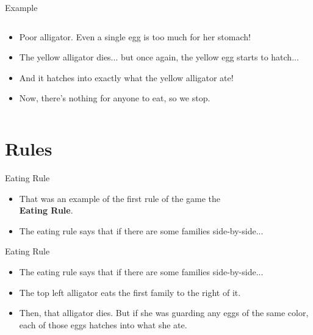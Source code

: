 \documentclass[usenames,dvipsnames]{beamer}
\newcommand{\pic}[2]{\texttt{[image: \#2]}}
\begin{document}
\begin{frame}{Example}
\begin{columns}
\begin{column}{0.6\textwidth}
\begin{itemize}
      \item<8|only@8>
        Poor alligator. Even a single egg is too much for her stomach!

      \item<9|only@9>
        The yellow alligator dies... but once again, the yellow egg starts to hatch...

      \item<10|only@10>
        And it hatches into exactly what the yellow alligator ate!

      \item<10|only@10>
        Now, there's nothing for anyone to eat, so we stop.
      \end{itemize}
    \end{column}
  \end{columns}
\end{frame}
\section{Rules}

\begin{frame}{Eating Rule}
  \begin{itemize}
  \item 
    That was an example of the first rule of the game the \\ \textbf{Eating Rule}.
  \item
    The eating rule says that if there are some families side-by-side...
  \end{itemize}
\end{frame}

\begin{frame}{Eating Rule}
  \begin{itemize}
    \item<1|only@1>
      The eating rule says that if there are some families side-by-side...

    \item<2|only@2>
      The top left alligator eats the first family to the right of it.

    \item<3|only@3>
      Then, that alligator dies. But if she was guarding any eggs of the same color,
      each of those eggs hatches into what she ate.
  \end{itemize}
\end{frame}
\end{document}
